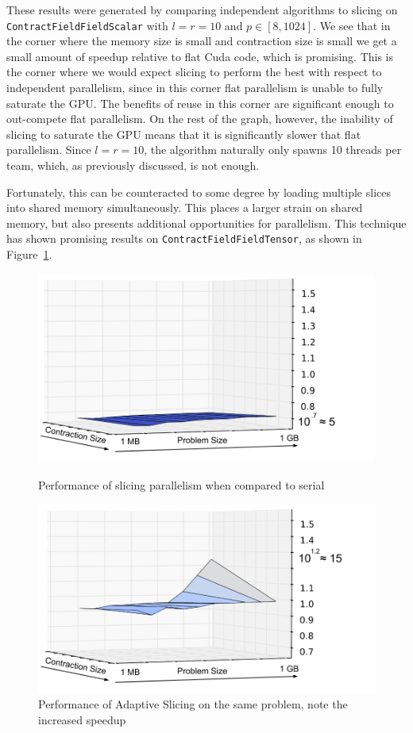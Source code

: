 These results were generated by comparing independent algorithms to slicing on
\texttt{ContractFieldFieldScalar} with $l = r = 10$ and $p \in [8,1024]$. We see
that in the corner where the memory size is small and contraction size is small
we get a small amount of speedup relative to flat Cuda code, which is
promising. This is the corner where we would expect slicing to perform the best
with respect to independent parallelism, since in this corner flat parallelism
is unable to fully saturate the GPU. The benefits of reuse in this corner are
significant enough to out-compete flat parallelism. On the rest of the graph,
however, the inability of slicing to saturate the GPU means that it is
significantly slower that flat parallelism. Since $l = r = 10$,
the algorithm naturally only spawns 10 threads per team, which, as previously discussed, is not enough. 

Fortunately, this can be counteracted to some degree by loading multiple slices 
into shared memory simultaneously. This places a larger strain on shared memory, 
but also presents additional opportunities for parallelism. 
This technique has shown promising results on \texttt{ContractFieldFieldTensor}, as shown in Figure~\ref{fig:TwoSlicings}. 

\begin{figure}[H]
    \centering
    \includegraphics[scale = .4]{CFFTSlicingVSSerial}
    \caption{Performance of slicing parallelism when compared to serial}

    \includegraphics[scale = .4]{CFFTAdaptiveSlicingVSSerial}
    \caption[Performance of adaptive slicing]{Performance of Adaptive Slicing on
    the same problem, note the increased speedup}
\label{fig:TwoSlicings}
\end{figure}

